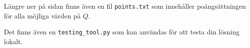Längre ner på sidan finns även en fil \texttt{points.txt} som innehåller poängsättningen för alla möjliga värden på $Q$.

Det finns även en \texttt{testing\_tool.py} som kan användas för att testa din lösning lokalt.



